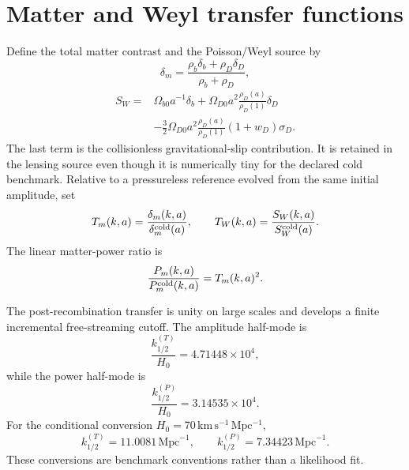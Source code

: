\section{Matter and Weyl transfer functions}

Define the total matter contrast and the Poisson/Weyl source by
\begin{equation}
 \delta_m
 =\frac{\rho_b\delta_b+\rho_D\delta_D}{\rho_b+\rho_D},
 \label{eq:cb-total-matter}
\end{equation}
\begin{equation}
 \begin{aligned}
 S_W={}&\Omega_{b0}a^{-1}\delta_b
 +\Omega_{D0}a^2\frac{\rho_D(a)}{\rho_D(1)}\delta_D\\
 &-\frac32\Omega_{D0}a^2\frac{\rho_D(a)}{\rho_D(1)}
 (1+w_D)\sigma_D.
 \end{aligned}
 \label{eq:cb-weyl-source}
\end{equation}
The last term is the collisionless gravitational-slip contribution.  It is retained in the lensing source even though it is numerically tiny for the declared cold benchmark.
Relative to a pressureless reference evolved from the same initial amplitude, set
\begin{equation}
 T_m(k,a)=\frac{\delta_m(k,a)}{\delta_m^{\rm cold}(a)},
 \qquad
 T_W(k,a)=\frac{S_W(k,a)}{S_W^{\rm cold}(a)}.
 \label{eq:cb-transfer-definitions}
\end{equation}
The linear matter-power ratio is
\begin{equation}
 \frac{P_m(k,a)}{P_m^{\rm cold}(k,a)}=T_m(k,a)^2.
 \label{eq:cb-power-ratio}
\end{equation}

The post-recombination transfer is unity on large scales and develops a finite incremental free-streaming cutoff.  The amplitude half-mode is
\begin{equation}
 \boxed{
 \frac{k_{1/2}^{(T)}}{H_0}=4.71448\times10^4,}
 \label{eq:cb-amplitude-half-mode}
\end{equation}
while the power half-mode is
\begin{equation}
 \boxed{
 \frac{k_{1/2}^{(P)}}{H_0}=3.14535\times10^4.}
 \label{eq:cb-power-half-mode}
\end{equation}
For the conditional conversion $H_0=70\,\mathrm{km\,s^{-1}\,Mpc^{-1}}$,
\begin{equation}
 \boxed{
 k_{1/2}^{(T)}=11.0081\,\mathrm{Mpc}^{-1},
 \qquad
 k_{1/2}^{(P)}=7.34423\,\mathrm{Mpc}^{-1}.}
 \label{eq:cb-half-mode-physical}
\end{equation}
These conversions are benchmark conventions rather than a likelihood fit.

